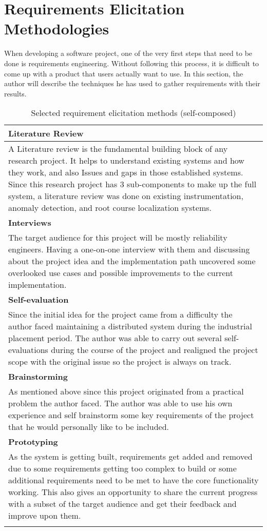\section{Requirements Elicitation Methodologies}

When developing a software project, one of the very first steps that need to be done is requirements engineering. Without following this process, it is difficult to come up with a product that users actually want to use. In this section, the author will describe the techniques he has used to gather requirements with their results.

\newpage

\begin{longtable}{|p{160mm}|}
\hline
\textbf{Literature Review} \\ \hline
A Literature review is the fundamental building block of any research project. It helps to understand existing systems and how they work, and also Issues and gaps in those established systems. Since this research project has 3 sub-components to make up the full system, a literature review was done on existing instrumentation, anomaly detection, and root course localization systems. \\ \hline

\textbf{Interviews} \\ \hline
The target audience for this project will be mostly reliability engineers. Having a one-on-one interview with them and discussing about the project idea and the implementation path uncovered some overlooked use cases and possible improvements to the current implementation. \\ \hline


\textbf{Self-evaluation} \\ \hline
Since the initial idea for the project came from a difficulty the author faced maintaining a distributed system during the industrial placement period. The author was able to carry out several self-evaluations during the course of the project and realigned the project scope with the original issue so the project is always on track. \\ \hline

\textbf{Brainstorming} \\ \hline
As mentioned above since this project originated from a practical problem the author faced. The author was able to use his own experience and self brainstorm some key requirements of the project that he would personally like to be included. \\ \hline

\textbf{Prototyping} \\ \hline
As the system is getting built, requirements get added and removed due to some requirements getting too complex to build or some additional requirements need to be met to have the core functionality working. This also gives an opportunity to share the current progress with a subset of the target audience and get their feedback and improve upon them. \\ \hline

\caption{Selected requirement elicitation methods (self-composed)}
\end{longtable}

